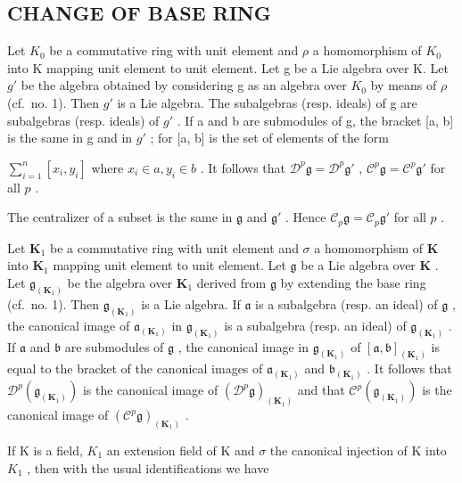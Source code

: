\subsection{CHANGE OF BASE RING}

Let \(K_{0}\) be a commutative ring with unit element and \(\rho\) a homomorphism of \(K_{0}\) into K mapping unit element to unit element. Let g be a Lie algebra over K. Let \(g'\) be the algebra obtained by considering g as an algebra over \(K_{0}\) by means of \(\rho\) (cf.~no. 1). Then \(g'\) is a Lie algebra. The subalgebras (resp. ideals) of g are subalgebras (resp. ideals) of \(g'\) . If a and b are submodules of g, the bracket {[}a, b{]} is the same in g and in \(g'\) ; for {[}a, b{]} is the set of elements of the form

\(\sum_{i=1}^{n}\left[x_i,y_i\right]\) where \(x_{i}\in a,y_{i}\in b\) . It follows that \(\mathcal{D}^p\mathfrak{g} = \mathcal{D}^p\mathfrak{g}'\) , \(\mathcal{C}^p\mathfrak{g} = \mathcal{C}^p\mathfrak{g}'\) for all \(p\) .

The centralizer of a subset is the same in \(\mathfrak{g}\) and \(\mathfrak{g}'\) . Hence \(\mathcal{C}_p\mathfrak{g} = \mathcal{C}_p\mathfrak{g}'\) for all \(p\) .

Let \(\mathbf{K}_1\) be a commutative ring with unit element and \(\sigma\) a homomorphism of \(\mathbf{K}\) into \(\mathbf{K}_1\) mapping unit element to unit element. Let \(\mathfrak{g}\) be a Lie algebra over \(\mathbf{K}\) . Let \(\mathfrak{g}_{(\mathbf{K}_1)}\) be the algebra over \(\mathbf{K}_1\) derived from \(\mathfrak{g}\) by extending the base ring (cf.~no. 1). Then \(\mathfrak{g}_{(\mathbf{K}_1)}\) is a Lie algebra. If \(\mathfrak{a}\) is a subalgebra (resp. an ideal) of \(\mathfrak{g}\) , the canonical image of \(\mathfrak{a}_{(\mathbf{K}_1)}\) in \(\mathfrak{g}_{(\mathbf{K}_1)}\) is a subalgebra (resp. an ideal) of \(\mathfrak{g}_{(\mathbf{K}_1)}\) . If \(\mathfrak{a}\) and \(\mathfrak{b}\) are submodules of \(\mathfrak{g}\) , the canonical image in \(\mathfrak{g}_{(\mathbf{K}_1)}\) of \([\mathfrak{a},\mathfrak{b}]_{(\mathbf{K}_1)}\) is equal to the bracket of the canonical images of \(\mathfrak{a}_{(\mathbf{K}_1)}\) and \(\mathfrak{b}_{(\mathbf{K}_1)}\) . It follows that \(\mathcal{D}^p (\mathfrak{g}_{(\mathbf{K}_1)})\) is the canonical image of \((\mathcal{D}^p\mathfrak{g})_{(\mathbf{K}_1)}\) and that \(\mathcal{C}^p (\mathfrak{g}_{(\mathbf{K}_1)})\) is the canonical image of \((\mathcal{C}^p\mathfrak{g})_{(\mathbf{K}_1)}\) .

If K is a field, \(K_{1}\) an extension field of K and \(\sigma\) the canonical injection of K into \(K_{1}\) , then with the usual identifications we have

